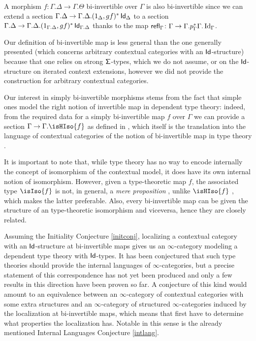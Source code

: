 \begin{rmk}
  A morphism $f\colon\Gamma.\Delta\rightarrow\Gamma.\Theta$ bi-invertible over
  $\Gamma$ is also bi-invertible since we can extend a section
  $\Gamma.\Delta\rightarrow\Gamma.\Delta.(1_\Delta,gf)^*\operatorname{\mathsf{Id}}_\Delta$
  to a section
  $\Gamma.\Delta\rightarrow\Gamma.\Delta.(1_{\Gamma.\Delta},gf)^*\operatorname{\mathsf{Id}}_{\Gamma.\Delta}$
  thanks to the map
  $\operatorname{\mathsf{refl}}_\Gamma\colon\Gamma\rightarrow\Gamma.p^*_\Gamma\Gamma.\operatorname{Id}_\Gamma$.
\end{rmk}

\begin{rmk}
  Our definition of bi-invertible map is less general than the one generally
  presented (which concerns arbitrary contextual categories with an
  $\operatorname{\mathsf{Id}}$-structure) because that one relies on strong $\operatorname{\mathsf{\Sigma}}$-types, which we
  do not assume, or on the $\operatorname{\mathsf{Id}}$-structure on iterated context extensions,
  however we did not provide the construction for arbitrary contextual
  categories.
\end{rmk}

\begin{rmk}
  Our interest in simply bi-invertible morphisms stems from the fact that simple
  ones model the right notion of invertible map in dependent type theory:
  indeed, from the
  required data for a simply bi-invertible map $f$ over $\Gamma$ we can provide
  a section $\Gamma\rightarrow\Gamma.\isHIso{f}$
  as defined in \cite[Def.\ B.3.3]{KL12}, which itself is the translation into
  the language of contextual categories of the notion of bi-invertible map in
  type theory \cite[Def.\ 4.3.1]{Uni13}.

  It is important to note that, while type theory has no way to encode
  internally the concept of isomorphism of the contextual model, it does have
  its own internal notion of isomorphism. However, given a type-theoretic map
  $f$, the associated type $\isIso{f}$ is not, in general, a \emph{mere
  proposition} \cite[Def.\ 3.3.1]{Uni13}, unlike $\isHIso{f}$
  \cite[Thm.\ 4.3.2]{Uni13}, which makes the latter
  preferable. Also, every bi-invertible map can be given the structure of an
  type-theoretic isomorphism and viceversa, hence they are closely related.
\end{rmk}

\begin{rmk}
  Assuming the Initiality Conjecture \ref{initconj}, localizing a contextual
  category with an
  $\operatorname{\mathsf{Id}}$-structure at bi-invertible maps gives us an $\infty$-category modeling a
  dependent type theory with $\operatorname{\mathsf{Id}}$-types. It has been conjectured that such
  type theories should provide the internal languages of $\infty$-categories, but a
  precise statement of this correspondence has not yet been produced and only a
  few results in this direction have been proven so far. A conjecture of this kind
  would amount to an equivalence between an $\infty$-category of contextual
  categories with some extra structures and an $\infty$-category of structured
  $\infty$-categories induced by the localization at bi-invertible maps, which
  means that first have to determine what properties the localization has.
  Notable in this sense is the already mentioned Internal Languages Conjecture
  \ref{intlang}.
\end{rmk}

